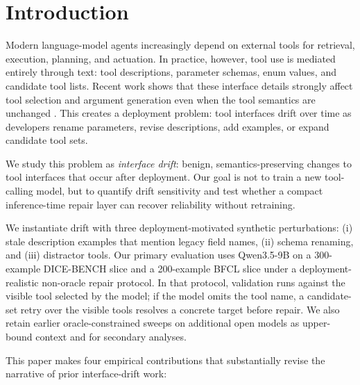 \documentclass[runningheads]{llncs}
\begin{document}
\section{Introduction}
Modern language-model agents increasingly depend on external tools for retrieval,
execution, planning, and actuation. In practice, however, tool use is mediated
entirely through text: tool descriptions, parameter schemas, enum values, and
candidate tool lists. Recent work shows that these interface details strongly affect
tool selection and argument generation
even when the tool semantics are unchanged \cite{guo2026rewrite,faghih2025gaming}.
This creates a deployment problem: tool interfaces drift over time as developers
rename parameters, revise descriptions, add examples, or expand candidate tool sets.

We study this problem as \emph{interface drift}: benign, semantics-preserving
changes to tool interfaces that occur after deployment. Our goal is not to train a
new tool-calling model, but to quantify drift sensitivity and test whether a compact
inference-time repair layer can recover reliability without retraining.

We instantiate drift with three deployment-motivated synthetic perturbations: (i) stale description
examples that mention legacy field names, (ii) schema renaming, and (iii) distractor
tools. Our primary evaluation uses Qwen3.5-9B on a 300-example DICE-BENCH slice
\cite{jang2025dicebench} and a 200-example BFCL slice \cite{bfcl2024} under a
deployment-realistic non-oracle repair protocol. In that protocol, validation runs
against the visible tool selected by the model; if the model omits the tool name, a
candidate-set retry over the visible tools resolves a concrete target before repair.
We also retain earlier oracle-constrained sweeps on additional open models as
upper-bound context and for secondary analyses.

This paper makes four empirical contributions that substantially revise the
narrative of prior interface-drift work:
\end{document}
